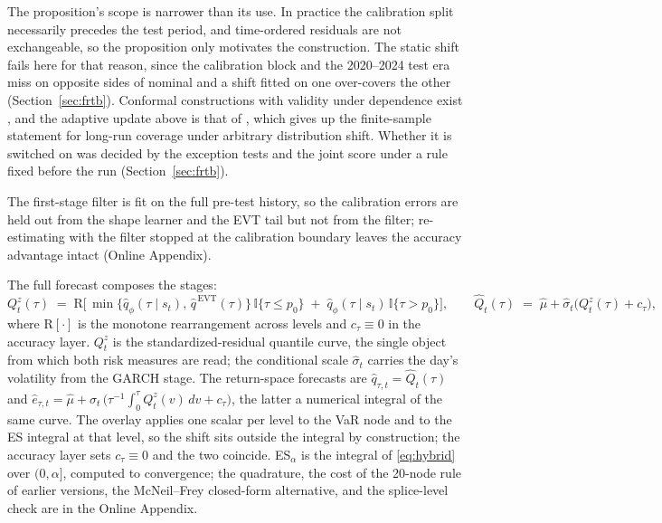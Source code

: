 \documentclass[11pt]{article}
\theoremstyle{remark}
\begin{document}
The proposition's scope is narrower than its use. In practice the calibration split necessarily precedes the test period, and time-ordered residuals are not exchangeable, so the proposition only motivates the construction. The static shift fails here for that reason, since the calibration block and the 2020--2024 test era miss on opposite sides of nominal and a shift fitted on one over-covers the other (Section~\ref{sec:frtb}). Conformal constructions with
validity under dependence exist \citep{chernozhukov2018conformal, barber2023, gibbs2021aci}, and the adaptive update above is that of \citet{gibbs2021aci}, which gives up the finite-sample statement for long-run coverage under arbitrary distribution shift. Whether it is switched on was decided by the exception tests and the joint score under a rule fixed before the run (Section~\ref{sec:frtb}).

The first-stage filter is fit on the full pre-test history, so the calibration errors are held out from the shape learner and the EVT tail but not from the filter; re-estimating with the filter stopped at the calibration boundary leaves the accuracy advantage intact (Online Appendix).

The full forecast composes the stages:
\begin{equation}
Q^{z}_t(\tau) \;=\;
\mathrm{R}\Big[\, \min\{\widehat{q}_\phi(\tau \mid s_t),\,
\widehat{q}^{\,\mathrm{EVT}}(\tau)\}\,\mathbb{I}\{\tau \le p_0\}
\;+\; \widehat{q}_\phi(\tau \mid s_t)\,\mathbb{I}\{\tau > p_0\}
\Big],\qquad
\widehat{Q}_t(\tau) \;=\; \widehat{\mu} + \widehat{\sigma}_t \big(Q^{z}_t(\tau) + c_\tau\big),
\label{eq:hybrid}
\end{equation}
where $\mathrm{R}[\cdot]$ is the monotone rearrangement across
levels \citep{cherno2010rearr} and $c_\tau\equiv0$ in the accuracy layer. $Q^{z}_t$ is the standardized-residual quantile curve, the single object from which both risk measures are read; the conditional scale $\widehat{\sigma}_t$ carries the day's volatility from the GARCH stage. The return-space forecasts are $\widehat{q}_{\tau,t}=\widehat{Q}_t(\tau)$
and $\widehat{e}_{\tau,t}=\widehat{\mu}+\widehat{\sigma}_t\,\big(\tau^{-1}\!\int_0^\tau Q^{z}_t(v)\,dv + c_\tau\big)$, the latter a numerical integral of the same curve. The overlay applies one scalar per level to the VaR node and to the ES integral at that level, so the shift sits outside the integral by construction; the accuracy layer sets $c_\tau\equiv0$ and the two coincide.
ES$_\alpha$ is the integral of \eqref{eq:hybrid} over $(0,\alpha]$, computed to convergence; the quadrature, the cost of the 20-node rule of earlier versions, the McNeil--Frey closed-form alternative, and the splice-level check are in the Online Appendix.
\end{document}
